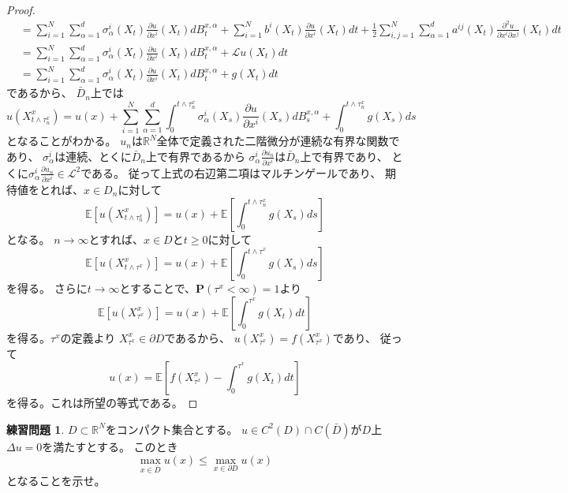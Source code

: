 \documentclass[uplatex]{jsarticle}
\theoremstyle{definition}
\newtheorem{prob}[prob]{練習問題}
\def\R{\mathbb{R}}
\def\P{\mathbf{P}}
\def\E{\mathbb{E}}
\def\mcL{\mathcal{L}}
\begin{document}
\begin{proof}
\begin{align*}
    &= \sum_{i=1}^N \sum_{\alpha=1}^d
    \sigma_\alpha^i(X_t)\frac{\partial u}{\partial x^i}(X_t)dB_t^{x,\alpha}
    + \sum_{i=1}^N b^i(X_t)\frac{\partial u}{\partial x^i}(X_t)dt
    + \frac{1}{2}\sum_{i,j=1}^N \sum_{\alpha=1}^d
    a^{ij}(X_t)\frac{\partial^2 u}{\partial x^i\partial x^j}(X_t) dt \\
    &= \sum_{i=1}^N \sum_{\alpha=1}^d
    \sigma_\alpha^i(X_t)\frac{\partial u}{\partial x^i}(X_t)dB_t^{x,\alpha}
    + \mcL u(X_t)dt \\
    &= \sum_{i=1}^N \sum_{\alpha=1}^d
    \sigma_\alpha^i(X_t)\frac{\partial u}{\partial x^i}(X_t)dB_t^{x,\alpha}
    + g(X_t)dt
  \end{align*}
  であるから、
  \(\bar{D}_n\)上では
  \[
  u(X_{t\wedge \tau_n^x}^x)
  = u(x) + \sum_{i=1}^N \sum_{\alpha=1}^d \int_0^{t\wedge \tau_n^x}
  \sigma_\alpha^i(X_s)\frac{\partial u}{\partial x^i}(X_s)dB_s^{x,\alpha}
  + \int_0^{t\wedge \tau_n^x}g(X_s)ds
  \]
  となることがわかる。
  \(u_n\)は\(\R^N\)全体で定義された二階微分が連続な有界な関数であり、
  \(\sigma^i_\alpha\)は連続、とくに\(\bar{D}_n\)上で有界であるから
  \(\sigma_\alpha^i\frac{\partial u_n}{\partial x^i}\)は\(\bar{D}_n\)上で有界であり、
  とくに\(\sigma_\alpha^i\frac{\partial u_n}{\partial x^i}\in \mcL^2\)である。
  従って上式の右辺第二項はマルチンゲールであり、
  期待値をとれば、\(x\in D_n\)に対して
  \[
  \E\left[ u(X_{t\wedge \tau_n^x}^x) \right]
  = u(x) + \E\left[ \int_0^{t\wedge \tau_n^x}g(X_s)ds \right]
  \]
  となる。
  \(n\to \infty\)とすれば、\(x\in D\)と\(t\geq 0\)に対して
  \[
  \E\left[ u(X_{t\wedge \tau^x}^x) \right]
  = u(x) + \E\left[ \int_0^{t\wedge \tau^x}g(X_s)ds \right]
  \]
  を得る。
  さらに\(t\to \infty\)とすることで、\(\P(\tau^x < \infty) = 1\)より
  \[
  \E\left[ u(X_{\tau^x}^x) \right]
  = u(x) + \E\left[ \int_0^{\tau^x}g(X_t)dt \right]
  \]
  を得る。\(\tau^x\)の定義より
  \(X_{\tau^x}^x\in \partial D\)であるから、
  \(u(X_{\tau^x}^x) = f(X_{\tau^x}^x)\)であり、
  従って
  \[
  u(x) = \E\left[ f(X_{\tau^x}^x) - \int_0^{\tau^x}g(X_t)dt\right]
  \]
  を得る。これは所望の等式である。
\end{proof}









\begin{prob}\label{prob: 6.7}
  \(D \subset \R^N\)をコンパクト集合とする。
  \(u\in C^2(D) \cap C(\bar{D})\)が\(D\)上
  \(\Delta u = 0\)を満たすとする。
  このとき
  \[
  \max_{x\in \bar{D}} u(x) \leq \max_{x\in \partial D}u(x)
  \]
  となることを示せ。
\end{prob}
\end{document}
